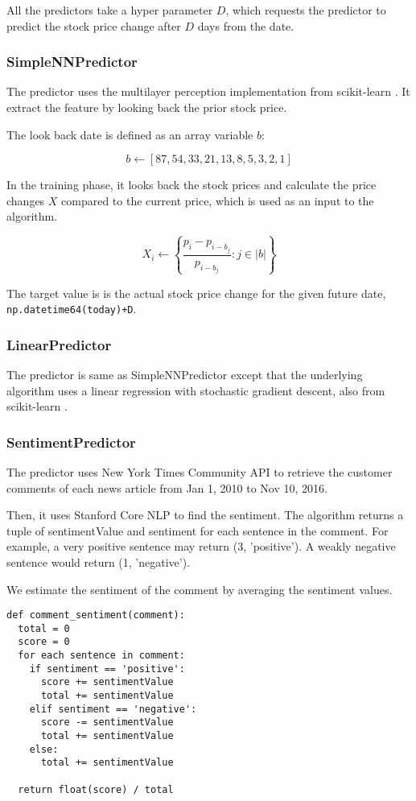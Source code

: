 \documentclass[twocolumn,10pt]{asme2ej}
\begin{document}
All the predictors take a hyper parameter $D$, which requests the
predictor to predict the stock price change after $D$ days from the date.

\subsubsection{SimpleNNPredictor}
The predictor uses the multilayer perception implementation from
scikit-learn \cite{web:scikit_learn}. It extract the feature by
looking back the prior stock price.

The look back date is defined as an array variable $b$:

\[
b \gets [87, 54, 33, 21, 13, 8, 5, 3, 2, 1]
\]

In the training phase, it looks back the stock prices and calculate
the price changes $X$ compared to the current price, which is used as
an input to the algorithm.

\[
X_i \gets \left\{\frac{p_i - p_{i - b_j}}{p_{i - b_j}} : j \in |b|\right\}
\]

The target value is is the actual stock price change for the given
future date, \verb|np.datetime64(today)+D|.

\subsubsection{LinearPredictor}
The predictor is same as SimpleNNPredictor except that the underlying
algorithm uses a linear regression with stochastic gradient descent,
also from scikit-learn \cite{web:scikit_learn}.

\subsubsection{SentimentPredictor}

The predictor uses New York Times Community API
\cite{web:nytimes_community_api} to retrieve the customer comments of
each news article from Jan 1, 2010 to Nov 10, 2016.

Then, it uses Stanford Core NLP \cite{manning-EtAl:2014:P14-5} to find
the sentiment. The algorithm returns a tuple of sentimentValue and
sentiment for each sentence in the comment. For example, a very
positive sentence may return (3, 'positive'). A weakly negative
sentence would return (1, 'negative').

We estimate the sentiment of the comment by averaging the sentiment
values.

\begin{verbatim}
def comment_sentiment(comment):
  total = 0
  score = 0
  for each sentence in comment:
    if sentiment == 'positive':
      score += sentimentValue
      total += sentimentValue
    elif sentiment == 'negative':
      score -= sentimentValue
      total += sentimentValue
    else:
      total += sentimentValue

  return float(score) / total
\end{verbatim}
\end{document}
